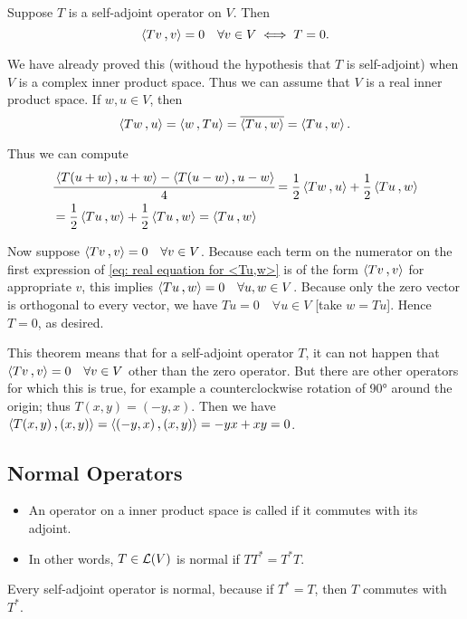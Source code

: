 \begin{thm}
   \label{thm: T self-adjoint and <Tv,v>=0 for all v <=> T=0}
   Suppose $T$ is a self-adjoint operator on $V$. Then
   \[
     \ip{Tv}{v} = 0 \quad \forall v \in V \iff T = 0.
   \]
\end{thm}
\begin{prf}
  We have already proved this (withoud the hypothesis that $T$ is self-adjoint) when $V$ is a complex inner product space. Thus we can assume that $V$ is a real inner product space. If $w,u \in V$, then
  \[
  \ip{Tw}{u} = \ip{w}{Tu} = \overline{\ip{Tu}{w}} = \ip{Tu}{w}.
  \]

  Thus we can compute
  \begin{equation}
      \label{eq: real equation for <Tu,w>}
    \begin{aligned}
    &\cfrac{\ip{T(u+w)}{u+w} - \ip{T(u-w)}{u-w}}{4}
    = \frac{1}{2} \ip{Tw}{u} + \frac{1}{2} \ip{Tu}{w} \\
    &= \frac{1}{2} \ip{Tu}{w} + \frac{1}{2} \ip{Tu}{w}
    = \ip{Tu}{w}
    \end{aligned}
  \end{equation}


  Now suppose $\ip{Tv}{v} = 0 \quad \forall v \in V$. Because each term on the numerator on the first expression of \eqref{eq: real equation for <Tu,w>} is of the form $\ip{Tv}{v}$ for appropriate $v$, this implies $\ip{Tu}{w} = 0 \quad \forall u,w \in V$. Because only the zero vector is orthogonal to every vector, we have $Tu=0 \quad \forall u \in V$ [take $w=Tu$]. Hence $T=0$, as desired.
\end{prf}

This theorem means that for a self-adjoint operator $T$, it can not happen that $\ip{Tv}{v} = 0 \quad \forall v \in V$ other than the zero operator. But there are other operators for which this is true, for example a counterclockwise rotation of 90° around the origin; thus $T(x,y) = (-y,x)$. Then we have $\ip{T(x,y)}{(x,y)} = \ip{(-y,x)}{(x,y)}=-yx+xy=0$.

\subsection{Normal Operators}

\begin{mydef}[normal]
  \phantom{.}
  \begin{itemize}
  \item An operator on a inner product space is called  if it commutes with its adjoint.

  \item In other words, $T \in \mathcal{L} (V)$ is normal if $TT^* = T^* T.$

  \end{itemize}
Every self-adjoint operator is normal, because if $T^* = T$, then $T$ commutes with $T^*$.
\end{mydef}

